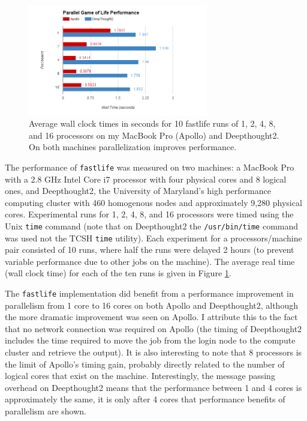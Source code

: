 \documentclass[11pt,letterpaper]{article}
\begin{document}
\begin{figure}
	\centering
    \includegraphics[width=0.7\textwidth]{figures/2d_performance.png}
    \caption{\textsf{Average wall clock times in seconds for 10 fastlife runs of 1, 2, 4, 8, and 16 processors on my MacBook Pro (Apollo) and Deepthought2. On both machines parallelization improves performance.}}
    \label{fig:2d_performance}
\end{figure}

The performance of \texttt{fastlife} was measured on two machines: a MacBook Pro with a 2.8 GHz Intel Core i7 processor with four physical cores and 8 logical ones, and Deepthought2, the University of Maryland's high performance computing cluster with 460 homogenous nodes and approximately 9,280 physical cores. Experimental runs for 1, 2, 4, 8, and 16 processors were timed using the Unix \texttt{time} command (note that on Deepthought2 the \texttt{/usr/bin/time} command was used not the TCSH \texttt{time} utility). Each experiment for a processors/machine pair consisted of 10 runs, where half the runs were delayed 2 hours (to prevent variable performance due to other jobs on the machine). The average real time (wall clock time) for each of the ten runs is given in Figure \ref{fig:2d_performance}.

The \texttt{fastlife} implementation did benefit from a performance improvement in parallelism from 1 core to 16 cores on both Apollo and Deepthought2, although the more dramatic improvement was seen on Apollo. I attribute this to the fact that no network connection was required on Apollo (the timing of Deepthought2 includes the time required to move the job from the login node to the compute cluster and retrieve the output). It is also interesting to note that 8 processors is the limit of Apollo's timing gain, probably directly related to the number of logical cores that exist on the machine. Interestingly, the message passing overhead on Deepthought2 means that the performance between 1 and 4 cores is approximately the same, it is only after 4 cores that performance benefits of parallelism are shown.
\end{document}
